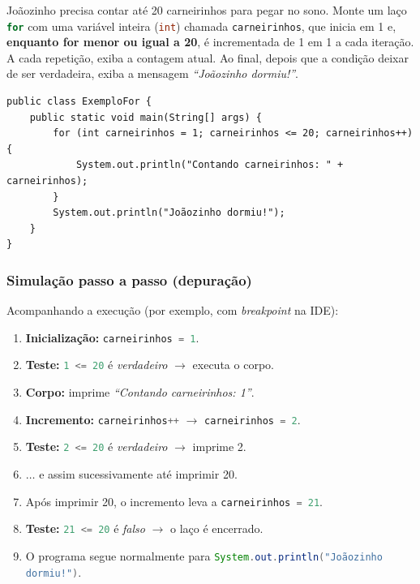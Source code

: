 \documentclass[12pt,a4paper]{article}
\newcommand{\codigo}[1]{\lstinline[language=Java,basicstyle=\ttfamily\small]|#1|}
\begin{document}
\begin{enunciado}
Joãozinho precisa contar até 20 carneirinhos para pegar no sono. Monte um laço
\codigo{for} com uma variável inteira (\codigo{int}) chamada \codigo{carneirinhos},
que inicia em 1 e, \textbf{enquanto for menor ou igual a 20}, é incrementada de 1
em 1 a cada iteração. A cada repetição, exiba a contagem atual. Ao final, depois
que a condição deixar de ser verdadeira, exiba a mensagem \emph{``Joãozinho
dormiu!''}.
\end{enunciado}

\begin{solucao}
\begin{lstlisting}[caption={ExemploFor.java}]
public class ExemploFor {
    public static void main(String[] args) {
        for (int carneirinhos = 1; carneirinhos <= 20; carneirinhos++) {
            System.out.println("Contando carneirinhos: " + carneirinhos);
        }
        System.out.println("Joãozinho dormiu!");
    }
}
\end{lstlisting}
\end{solucao}

\subsubsection{Simulação passo a passo (depuração)}

Acompanhando a execução (por exemplo, com \emph{breakpoint} na IDE):

\begin{enumerate}
  \item \textbf{Inicialização:} \codigo{carneirinhos = 1}.
  \item \textbf{Teste:} \codigo{1 <= 20} é \emph{verdadeiro} $\rightarrow$ executa o corpo.
  \item \textbf{Corpo:} imprime \emph{``Contando carneirinhos: 1''}.
  \item \textbf{Incremento:} \codigo{carneirinhos++} $\rightarrow$ \codigo{carneirinhos = 2}.
  \item \textbf{Teste:} \codigo{2 <= 20} é \emph{verdadeiro} $\rightarrow$ imprime 2.
  \item $\ldots$ e assim sucessivamente até imprimir 20.
  \item Após imprimir 20, o incremento leva a \codigo{carneirinhos = 21}.
  \item \textbf{Teste:} \codigo{21 <= 20} é \emph{falso} $\rightarrow$ o laço é encerrado.
  \item O programa segue normalmente para \codigo{System.out.println("Joãozinho dormiu!")}.
\end{enumerate}
\end{document}
